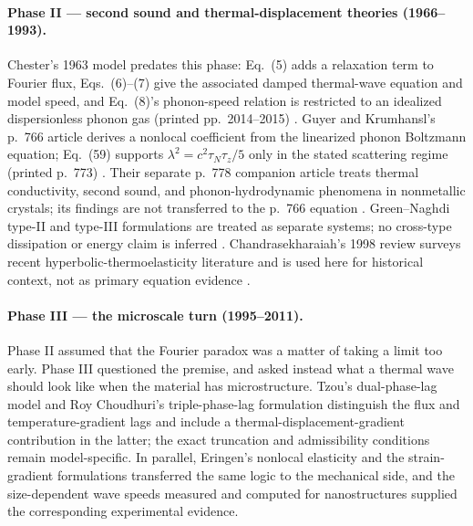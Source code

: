\paragraph{Phase II --- second sound and thermal-displacement theories (1966--1993).} Chester's 1963 model predates this phase: Eq.~(5) adds a relaxation term to Fourier flux, Eqs.~(6)--(7) give the associated damped thermal-wave equation and model speed, and Eq.~(8)'s phonon-speed relation is restricted to an idealized dispersionless phonon gas (printed pp.~2014--2015) \cite{Chester1963}. Guyer and Krumhansl's p.~766 article derives a nonlocal coefficient from the linearized phonon Boltzmann equation; Eq.~(59) supports $\lambda^2=c^2\tau_N\tau_z/5$ only in the stated scattering regime (printed p.~773) \cite{GuyerKrumhansl1966}. Their separate p.~778 companion article treats thermal conductivity, second sound, and phonon-hydrodynamic phenomena in nonmetallic crystals; its findings are not transferred to the p.~766 equation \cite{GuyerKrumhansl1966II}. Green--Naghdi type-II and type-III formulations are treated as separate systems; no cross-type dissipation or energy claim is inferred \cite{Green1993,GreenGN1992}. Chandrasekharaiah's 1998 review surveys recent hyperbolic-thermoelasticity literature and is used here for historical context, not as primary equation evidence \cite{Chandrasekharaiah1998}.

\paragraph{Phase III --- the microscale turn (1995--2011).} Phase II assumed that the Fourier paradox was a matter of taking a limit too early. Phase III questioned the premise, and asked instead what a thermal wave should look like when the material has microstructure. Tzou's dual-phase-lag model \cite{Tzou1995} and Roy Choudhuri's triple-phase-lag formulation \cite{RoyChoudhuri2007} distinguish the flux and temperature-gradient lags and include a thermal-displacement-gradient contribution in the latter; the exact truncation and admissibility conditions remain model-specific. In parallel, Eringen's nonlocal elasticity \cite{Eringen1972,Eringen1974,Eringen1983} and the strain-gradient formulations \cite{Askes2006,Askes2011,Polizzotto2001} transferred the same logic to the mechanical side, and the size-dependent wave speeds measured and computed for nanostructures \cite{Maranganti2006,Maranganti2007} supplied the corresponding experimental evidence.

